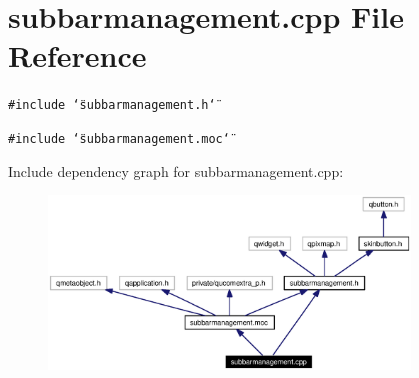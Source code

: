 \section{subbarmanagement.cpp File Reference}
\label{subbarmanagement_8cpp}


{\tt \#include \char`\"{}subbarmanagement.h\char`\"{}}\par
{\tt \#include \char`\"{}subbarmanagement.moc\char`\"{}}\par


Include dependency graph for subbarmanagement.cpp:\begin{figure}[H]
\begin{center}
\leavevmode
\includegraphics[width=272pt]{subbarmanagement_8cpp__incl}
\end{center}
\end{figure}
